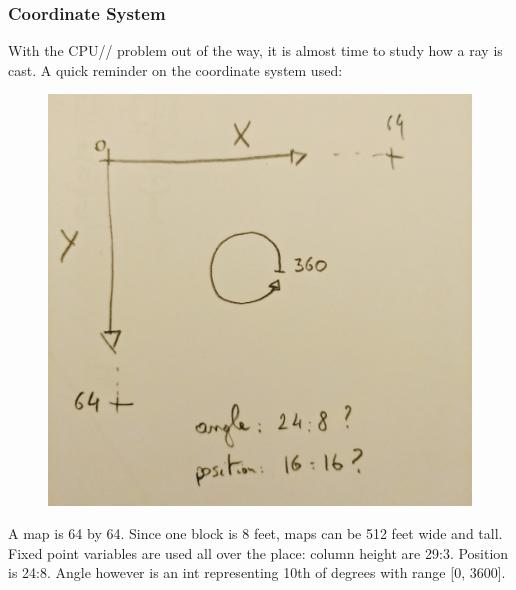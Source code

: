 \subsubsection{Coordinate System}
With the CPU// problem out of the way, it is almost time to study how a ray is cast. A quick reminder on the coordinate system used:
\begin{figure}[H]
  \centering
 \includegraphics[width=.5\textwidth]{imgs/drawings/coordinate_system.png}
\end{figure}
\par
A map is 64 by 64. Since one block is 8 feet, maps can be 512 feet wide and tall. Fixed point variables are used all over the place: column height are 29:3. Position is 24:8. Angle however is an int representing 10th of degrees with range [0, 3600].

















